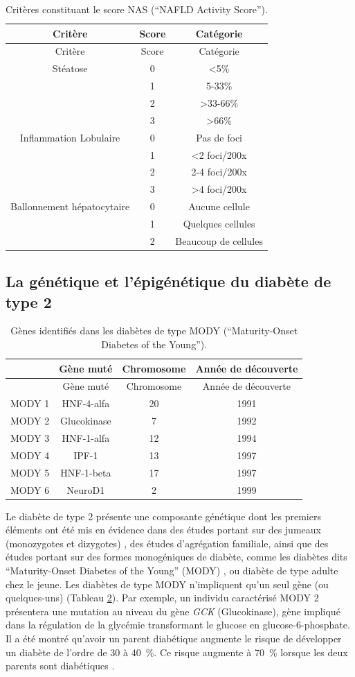 \documentclass[11pt,a4paper,notrimn]{krantz}
\theoremstyle{definition}
\theoremstyle{definition}
\theoremstyle{remark}
\begin{document}
\begin{longtable}[]{@{}ccc@{}}
\caption{\label{tab:nas}Critères constituant le score NAS (``NAFLD Activity Score'').}\tabularnewline
\toprule
Critère & Score & Catégorie\tabularnewline
\midrule
\endfirsthead
\toprule
Critère & Score & Catégorie\tabularnewline
\midrule
\endhead
Stéatose & 0 & \textless{}5\%\tabularnewline
& 1 & 5-33\%\tabularnewline
& 2 & \textgreater{}33-66\%\tabularnewline
& 3 & \textgreater{}66\%\tabularnewline
Inflammation Lobulaire & 0 & Pas de foci\tabularnewline
& 1 & \textless{}2 foci/200x\tabularnewline
& 2 & 2-4 foci/200x\tabularnewline
& 3 & \textgreater{}4 foci/200x\tabularnewline
Ballonnement hépatocytaire & 0 & Aucune cellule\tabularnewline
& 1 & Quelques cellules\tabularnewline
& 2 & Beaucoup de cellules\tabularnewline
\bottomrule
\end{longtable}

\subsection{La génétique et l'épigénétique du diabète de type
2}\label{la-genetique-et-lepigenetique-du-diabete-de-type-2}




\begin{longtable}[]{@{}lccc@{}}
\caption{\label{tab:MODY}Gènes identifiés dans les diabètes de type MODY
(``Maturity-Onset Diabetes of the Young'').}\tabularnewline
\toprule
& Gène muté & Chromosome & Année de découverte\tabularnewline
\midrule
\endfirsthead
\toprule
& Gène muté & Chromosome & Année de découverte\tabularnewline
\midrule
\endhead
MODY 1 & HNF-4-alfa & 20 & 1991\tabularnewline
MODY 2 & Glucokinase & 7 & 1992\tabularnewline
MODY 3 & HNF-1-alfa & 12 & 1994\tabularnewline
MODY 4 & IPF-1 & 13 & 1997\tabularnewline
MODY 5 & HNF-1-beta & 17 & 1997\tabularnewline
MODY 6 & NeuroD1 & 2 & 1999\tabularnewline
\bottomrule
\end{longtable}

Le diabète de type 2 présente une composante génétique dont les premiers
éléments ont été mis en évidence dans des études portant sur des jumeaux
(monozygotes et dizygotes) \citep{kaprio_concordance_1992}, des études
d'agrégation familiale, ainsi que des études portant sur des formes
monogéniques de diabète, comme les diabètes dits ``Maturity-Onset
Diabetes of the Young'' (MODY) \citep{thanabalasingham_diagnosis_2011},
ou diabète de type adulte chez le jeune. Les diabètes de type MODY
n'impliquent qu'un seul gène (ou quelques-uns) (Tableau \ref{tab:MODY}).
Par exemple, un individu caractérisé MODY 2 présentera une mutation au
niveau du gène \emph{GCK} (Glucokinase), gène impliqué dans la
régulation de la glycémie transformant le glucose en
glucose-6-phosphate. Il a été montré qu'avoir un parent diabétique
augmente le risque de développer un diabète de l'ordre de 30 à 40~\%. Ce
risque augmente à 70~\% lorsque les deux parents sont diabétiques
\citep{kobberling_empirical_1982, meigs_parental_2000}.
\end{document}
